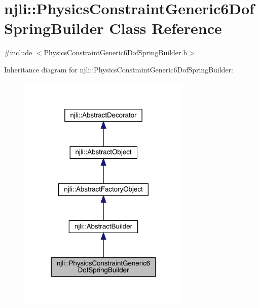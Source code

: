 \hypertarget{classnjli_1_1_physics_constraint_generic6_dof_spring_builder}{}\section{njli\+:\+:Physics\+Constraint\+Generic6\+Dof\+Spring\+Builder Class Reference}
\label{classnjli_1_1_physics_constraint_generic6_dof_spring_builder}


{\ttfamily \#include $<$Physics\+Constraint\+Generic6\+Dof\+Spring\+Builder.\+h$>$}



Inheritance diagram for njli\+:\+:Physics\+Constraint\+Generic6\+Dof\+Spring\+Builder\+:\nopagebreak
\begin{figure}[H]
\begin{center}
\leavevmode
\includegraphics[width=234pt]{classnjli_1_1_physics_constraint_generic6_dof_spring_builder__inherit__graph}
\end{center}
\end{figure}


